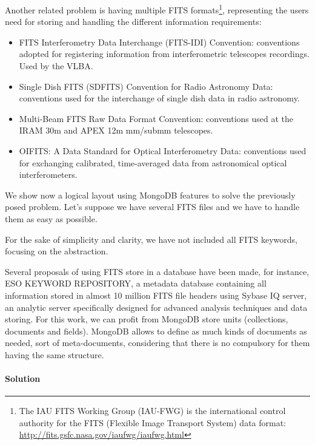 Another related problem is having multiple FITS formats\footnote{The IAU FITS Working Group (IAU-FWG) is the international control authority for the FITS (Flexible Image Transport System) data format: \url{http://fits.gsfc.nasa.gov/iaufwg/iaufwg.html}}, representing the users need for storing and handling the different information requirements:

\begin{itemize}
\item FITS Interferometry Data Interchange (FITS-IDI) Convention: conventions adopted for registering information from interferometric telescopes recordings. Used by the VLBA.
\item Single Dish FITS (SDFITS) Convention for Radio Astronomy Data: conventions used for the interchange of single dish data in radio astronomy. 
\item Multi-Beam FITS Raw Data Format Convention: conventions used at the IRAM 30m and APEX 12m mm/submm telescopes.
\item OIFITS: A Data Standard for Optical Interferometry Data: conventions used for exchanging calibrated, time-averaged data from astronomical optical interferometers.
\end{itemize}


We show now a logical layout using MongoDB features to solve the previously posed problem. Let's suppose we have several FITS files and we have to handle them as easy as possible.

For the sake of simplicity and clarity, we have not included all FITS keywords, focusing on the abstraction.

Several proposals of using FITS store in a database have been made, for instance, ESO KEYWORD REPOSITORY, a metadata database containing all information stored in almost 10 million FITS file headers using Sybase IQ server, an analytic server specifically designed for advanced analysis techniques and data storing. For this work, we can profit from MongoDB store units (collections, documents and fields). MongoDB allows to define as much kinds of documents as needed, sort of meta-documents, considering that there is no compulsory for them having the same structure. 

\paragraph{Solution}

